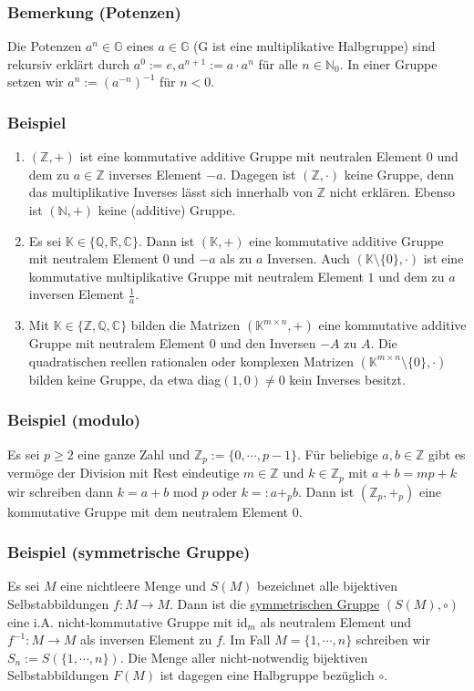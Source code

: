 \subsubsection{Bemerkung (Potenzen)}
Die Potenzen $a^n\in \mathbb{G}$ eines $a\in\mathbb{G}$ (G ist eine multiplikative Halbgruppe) sind rekursiv erklärt durch $a^0:=e, a^{n+1}:=a\cdot a^n$ für alle $n\in\mathbb{N}_0$.  In einer Gruppe setzen wir $a^n:=(a^{-n})^{-1}$ für $n<0$.
\subsubsection{Beispiel}
\begin{enumerate}
\item $(\mathbb{Z},+)$ ist eine kommutative additive Gruppe mit neutralen Element $0$ und dem zu $a\in\mathbb{Z}$ inverses Element $-a$.  Dagegen ist $(\mathbb{Z},\cdot )$ keine Gruppe, denn das multiplikative Inverses lässt sich innerhalb von $\mathbb{Z}$ nicht erklären.  Ebenso ist $(\mathbb{N},+)$ keine (additive) Gruppe.
\item Es sei $\mathbb{K}\in \{\mathbb{Q},\mathbb{R},\mathbb{C}\}$. Dann ist $(\mathbb{K},+)$ eine kommutative additive Gruppe mit neutralem Element $0$ und $-a$ als zu $a$ Inversen.  Auch $(\mathbb{K}\setminus \{0\},\cdot )$ ist eine kommutative multiplikative Gruppe mit neutralem Element $1$ und dem zu $a$ inversen Element $\frac{1}{a}$.
\item Mit $\mathbb{K}\in\{\mathbb{Z},\mathbb{Q},\mathbb{C}\}$ bilden die Matrizen $(\mathbb{K}^{m\times n},+)$ eine kommutative additive Gruppe mit neutralem Element $0$ und den Inversen $-A$ zu $A$.  Die quadratischen reellen rationalen oder komplexen Matrizen $(\mathbb{K}^{m\times n}\setminus \{0\},\cdot)$ bilden keine Gruppe, da etwa diag$(1,0)\not= 0$ kein Inverses besitzt.
\end{enumerate}
\addtocounter{subsubsection}{1}
\subsubsection{Beispiel (modulo)}
Es sei $p\geq 2$ eine ganze Zahl und $\mathbb{Z}_p:=\{0,\cdots ,p-1\}$.  Für beliebige $a,b\in\mathbb{Z}$ gibt es vermöge der Division mit Rest eindeutige $m\in\mathbb{Z}$ und $k\in\mathbb{Z}_p$ mit $a+b=mp+k$ wir schreiben dann $k=a+b$ mod $p$ oder $k=:a+_p b$.  Dann ist $(\mathbb{Z}_p,+_p)$ eine kommutative Gruppe mit dem neutralem Element $0$.
\subsubsection{Beispiel (symmetrische Gruppe)}
\label{symmetrische}
Es sei $M$ eine nichtleere Menge und $S(M)$ bezeichnet alle bijektiven Selbstabbildungen $f:M\rightarrow M$.  Dann ist die \underline{symmetrischen Gruppe} $(S(M),\circ )$ eine i.A. nicht-kommutative Gruppe mit id$_m$ als neutralem Element und $f^{-1}:M\rightarrow M$ als inversen Element zu $f$.  Im Fall $M=\{1,\cdots ,n\}$ schreiben wir $S_n:=S(\{1,\cdots ,n\})$.  Die Menge aller nicht-notwendig bijektiven Selbstabbildungen $F(M)$ ist dagegen eine Halbgruppe bezüglich $\circ$.
